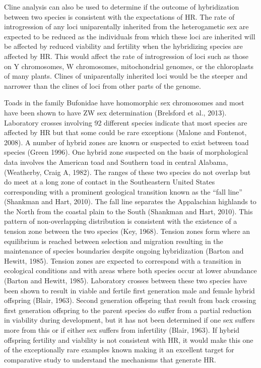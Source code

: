 Cline analysis can also be used to determine if the outcome of hybridization 
between two species is consistent with the expectations of HR. The rate of 
introgression of any loci uniparentally inherited from the heterogametic sex
are expected to be reduced as the individuals from which these loci are inherited 
will be affected by reduced viability and fertility when the hybridizing species 
are affected by HR. This would affect the rate of introgression of loci such as 
those on Y chromosomes, W chromosomes, mitochondrial genomes, or the chloroplasts 
of many plants. Clines of uniparentally inherited loci would be the steeper and 
narrower than the clines of loci from other parts of the genome.

Toads in the family Bufonidae have homomorphic sex chromosomes and most have 
been shown to have ZW sex determination (Brelsford et al., 2013). Laboratory 
crosses involving 92 different species indicate that most species are affected 
by HR but that some could be rare exceptions (Malone and Fontenot, 2008). A 
number of hybrid zones are known or suspected to exist between toad species 
(Green 1996). One hybrid zone suspected on the basis of morphological data 
involves the American toad and Southern toad in central Alabama, (Weatherby, Craig A, 1982). 
The ranges of these two species do not overlap but do meet at a long zone of 
contact in the Southeastern United States corresponding with a prominent 
geological transition known as the “fall line” (Shankman and Hart, 2010). 
The fall line separates the Appalachian highlands to the North from the coastal 
plain to the South (Shankman and Hart, 2010). This pattern of non-overlapping 
distribution is consistent with the existence of a tension zone between the two 
species (Key, 1968). Tension zones form where an equilibrium is reached between 
selection and migration resulting in the maintenance of species boundaries despite 
ongoing hybridization (Barton and Hewitt, 1985). Tension zones are expected to 
correspond with a transition in ecological conditions and with areas where both 
species occur at lower abundance (Barton and Hewitt, 1985). Laboratory crosses 
between these two species have been shown to result in viable and fertile first 
generation male and female hybrid offspring (Blair, 1963). Second generation 
offspring that result from back crossing first generation offspring to the parent 
species do suffer from a partial reduction in viability during development, but 
it has not been determined if one sex suffers more from this or if either sex 
suffers from infertility (Blair, 1963). If hybrid offspring fertility and viability 
is not consistent with HR, it would make this one of the exceptionally rare examples 
known making it an excellent target for comparative study to understand the mechanisms 
that generate HR.

